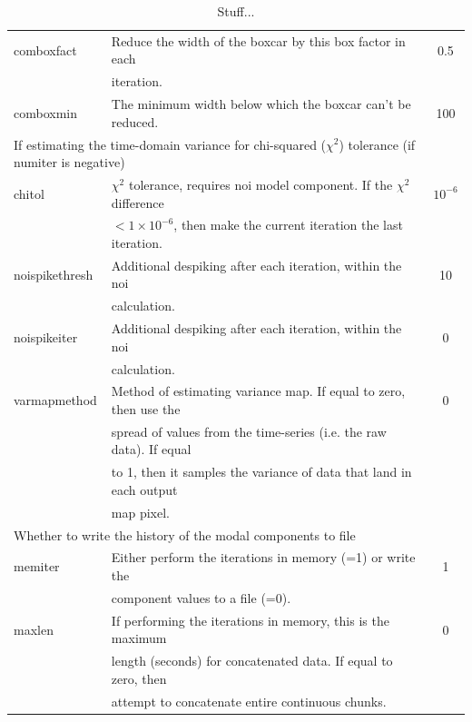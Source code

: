 \documentclass[twoside,11pt]{article}
\renewcommand{\_}{\texttt{\symbol{95}}}
\begin{document}
\begin{table}
\begin{tabular}{llc}
com\_boxfact         &    Reduce the width of the boxcar by this box factor in each        &   0.5 \\
                     &   iteration.                                                        & \\
com\_boxmin          &   The minimum width below which the boxcar can't be reduced.        & 100 \\
\hline
\multicolumn{3}{l}{If estimating the time-domain variance for chi-squared ($\chi^2$) tolerance (if numiter is negative)} \\
\hline
chitol            &   $\chi^2$ tolerance, requires noi model component. If the $\chi^2$ difference & $10^{-6}$\\
                  &   $<1\times10^{-6}$, then make the current iteration the last iteration.       & \\
noispikethresh    &   Additional despiking after each iteration, within the noi                    & 10 \\
                  &   calculation.                                                                 & \\
noispikeiter      &   Additional despiking after each iteration, within the noi                    & 0 \\
                  &   calculation.                                                                 & \\
varmapmethod      &   Method of estimating variance map. If equal to zero, then use the            & 0 \\
                  &   spread of values from the time-series (i.e. the raw data). If equal          & \\
                  &   to 1, then it samples the variance of data that land in each output          & \\
                  &   map pixel.                                                                   & \\
\hline
\multicolumn{3}{l}{Whether to write the history of the modal components to file} \\
\hline
memiter           &   Either perform the iterations in memory (=1) or write the       &    1 \\
                  &   component values to a file (=0).                                & \\
maxlen            &   If performing the iterations in memory, this is the maximum     &    0 \\
                  &   length (seconds) for concatenated data. If equal to zero, then  & \\
                  &   attempt to concatenate entire continuous chunks.                & \\
\hline
\end{tabular}
\caption{Stuff...}
\end{table}
\end{document}
